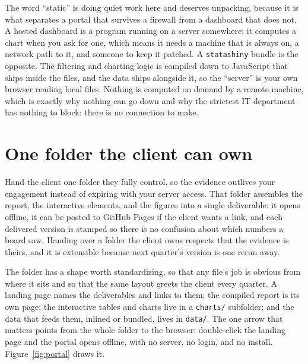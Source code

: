 \documentclass[
    a4paper,
    fontsize=10pt,
    twoside=true,
    numbers=noenddot,
]{kaobook}
\begin{document}
The word \enquote{static} is doing quiet work here and deserves unpacking, because it is what separates a portal that survives a firewall from a dashboard that does not. A hosted dashboard is a program running on a server somewhere: it computes a chart when you ask for one, which means it needs a machine that is always on, a network path to it, and someone to keep it patched. A \texttt{statashiny} bundle is the opposite. The filtering and charting logic is compiled down to JavaScript that ships inside the files, and the data ships alongside it, so the \enquote{server} is your own browser reading local files. Nothing is computed on demand by a remote machine, which is exactly why nothing can go down and why the strictest IT department has nothing to block: there is no connection to make.

\section{One folder the client can own}
Hand the client one folder they fully control, so the evidence outlives your engagement instead of expiring with your server access. That folder assembles the report, the interactive elements, and the figures into a single deliverable: it opens offline, it can be posted to GitHub Pages if the client wants a link, and each delivered version is stamped so there is no confusion about which numbers a board saw. Handing over a folder the client owns respects that the evidence is theirs, and it is extensible because next quarter's version is one rerun away.

The folder has a shape worth standardizing, so that any file's job is obvious from where it sits and so that the same layout greets the client every quarter. A landing page names the deliverables and links to them; the compiled report is its own page; the interactive tables and charts live in a \texttt{charts/} subfolder; and the data that feeds them, inlined or bundled, lives in \texttt{data/}. The one arrow that matters points from the whole folder to the browser: double-click the landing page and the portal opens offline, with no server, no login, and no install. Figure~\ref{fig:portal} draws it.
\end{document}
